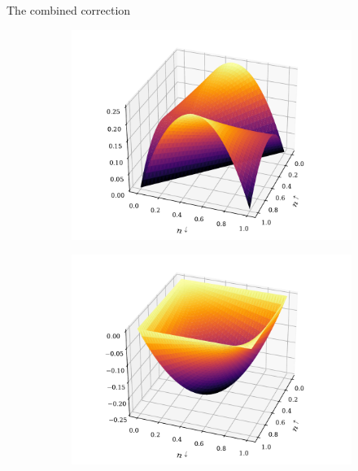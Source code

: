 \documentclass[xcolor=table,aspectratio=169]{beamer}
\numberwithin{equation}{section}
\begin{document}
\begin{frame}{The combined correction}
    \begin{figure}
        \centering
        \begin{subfigure}[b]{0.4\columnwidth}
            \includegraphics[width=\columnwidth]{figures/novel_u_correction.pdf}
        \end{subfigure}
        \raisebox{2cm}{\huge +}
        \begin{subfigure}[b]{0.4\columnwidth}
            \includegraphics[width=\columnwidth]{figures/novel_k_correction.pdf}
        \end{subfigure}
    \end{figure}


\end{frame}
\end{document}
